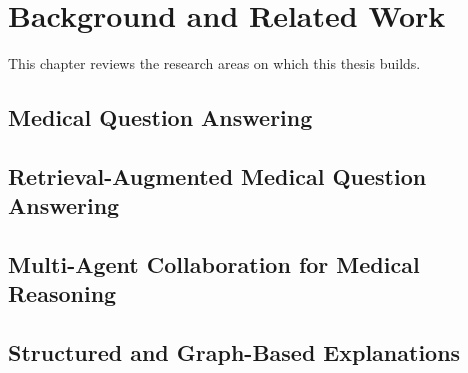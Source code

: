 \chapter{Background and Related Work}
\label{chap:related_work}


This chapter reviews the research areas on which this thesis builds. 

\section{Medical Question Answering}
\label{sec:rw_medqa}

\section{Retrieval-Augmented Medical Question Answering}
\label{sec:rw_rag}

\section{Multi-Agent Collaboration for Medical Reasoning}
\label{sec:rw_agents}

\section{Structured and Graph-Based Explanations}
\label{sec:rw_graphs}

